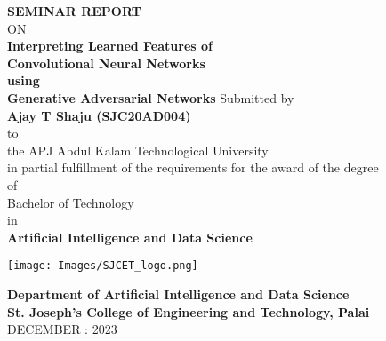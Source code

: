 

\setcounter{page}{1}


\newpage

\thispagestyle{empty}
\begin{center}
 
{\normalsize \bf SEMINAR REPORT}\\
ON\\
\vspace*{0.2 cm}
{\huge \bf Interpreting Learned Features of}\\ %
\vspace{2mm}
{\huge \bf Convolutional Neural Networks}\\
\vspace{2mm}
{\huge \bf using}\\
\vspace{2mm}
{\huge \bf Generative Adversarial Networks}
\vspace{0.5 cm}
\large Submitted by\\
{ \bf Ajay T Shaju (SJC20AD004)}\\[-0.6mm]
{\large to\\[-0.6mm] the APJ Abdul Kalam Technological University\\[-0.6mm] in partial fulfillment of the requirements for the award of the degree\\[-0.6mm] of\\[-0.6mm] Bachelor of Technology\\[-0.6mm] in\\[-0.6mm] {\bf Artificial Intelligence and Data Science}}

 \begin{center}
 \texttt{[image: Images/SJCET\_logo.png]}
 \end{center}
 \vspace*{-0.5cm}
{\LARGE {\bf Department of Artificial Intelligence and Data Science}}\\
        [-3mm] {\large {\bf St. Joseph's College of Engineering and Technology, Palai}\\
         [1mm] DECEMBER : 2023}

\end{center}

